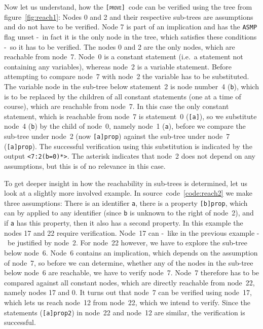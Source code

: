 \documentclass[british]{article}
\newcommand\prv{bc}
\newcommand\m[1]{\texttt{#1}}
\newcommand\name{\texttt{\textsc{[prove]}}}
\begin{document}
Now let us understand, how the \name\ code can be verified using the tree from
figure~\ref{fig:reach1}: Nodes 0 and 2 and their respective sub-trees are
assumptions and do not have to be verified. Node 7 is part of an implication and
has the \texttt{ASMP} flag unset -\ in fact it is the only node in the tree,
which satisfies these conditions -\ so it has to be verified. The nodes 0 and 2
are the only nodes, which are reachable from node~7. Node~0 is a constant
statement (i.e.\ a statement not containing any variables), whereas node~2 is a
variable statement. Before attempting to compare node~7 with node~2 the variable
has to be substituted. The variable node in the sub-tree below statement~2 is
node number~4 (\m{b}), which is to be replaced by the children of all constant
statements (one at a time of course), which are reachable from node~7. In this
case the only constant statement, which is reachable from node~7 is statement~0
(\m{[a]}), so we substitute node~4 (\m{b}) by the child of node~0, namely node~1
(\m{a}), before we compare the sub-tree under node~2 (now \m{[a]prop}) against
the sub-tree under node~7 (\m{[a]prop}). The successful verification using this
substitution is indicated by the output \m{<7:2(b=0)*>}. The asterisk indicates
that node~2 does not depend on any assumptions, but this is of no relevance in
this case.
\newline

To get deeper insight in how the reachability in sub-trees is determined, let us
look at a slightly more involved example. In source~code~\ref{code:reach2} we
make three assumptions: There is an identifier \m{a}, there is a property
\m{[b]prop}, which can by applied to any identifier (since \m{b} is unknown to
the right of node~2), and if \m{a} has this property, then it also has a second
property. In this example the nodes 17 and 22 require verification.  Node~17 can
-\ like in the previous example -\ be justified by node~2.  For node~22 however,
we have to explore the sub-tree below node~6. Node~6 contains an implication,
which depends on the assumption of node~7, so before we can determine, whether
any of the nodes in the sub-tree below node~6 are reachable, we have to verify
node~7.  Node~7 therefore has to be compared against all constant nodes, which
are directly reachable from node~22, namely nodes 17 and 0. It turns out that
node~7 can be verified using node~17, which lets us reach node~12 from node~22,
which we intend to verify. Since the statements (\m{[a]prop2}) in node~22 and
node~12 are similar, the verification is successful.
\end{document}
